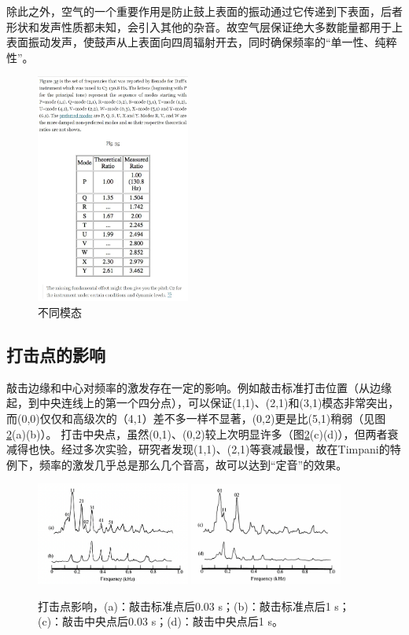 除此之外，空气的一个重要作用是防止鼓上表面的振动通过它传递到下表面，后者形状和发声性质都未知，会引入其他的杂音。故空气层保证绝大多数能量都用于上表面振动发声，使鼓声从上表面向四周辐射开去，同时确保频率的“单一性、纯粹性”。
\begin{figure}[h]
	\centering %
	\includegraphics[width=0.45\textwidth]{pic/pic5} %
	\caption{不同模态}
	\label{fig.4}	%
\end{figure}
\subsection{打击点的影响}
敲击边缘和中心对频率的激发存在一定的影响。例如敲击标准打击位置（从边缘起，到中央连线上的第一个四分点），可以保证(1,1)、(2,1)和(3,1)模态非常突出，而(0,0)仅仅和高级次的（4,1）差不多一样不显著，(0,2)更是比(5,1)稍弱（见图\ref{fig.3}(a)(b)）。
打击中央点，虽然(0,1)、(0,2)较上次明显许多（图\ref{fig.3}(c)(d)），但两者衰减得也快。经过多次实验，研究者发现(1,1)、(2,1)等衰减最慢，故在Timpani的特例下，频率的激发几乎总是那么几个音高，故可以达到“定音”的效果。
\begin{figure}[t]
	\centering %
	\includegraphics[width=0.45\textwidth]{pic/pic3} %
	\includegraphics[width=0.45\textwidth]{pic/pic4}
	\caption{打击点影响，(a)：敲击标准点后0.03 s；(b)：敲击标准点后1 s；(c)：敲击中央点后0.03 s；(d)：敲击中央点后1 s。} %
	\label{fig.3}	%
\end{figure}
